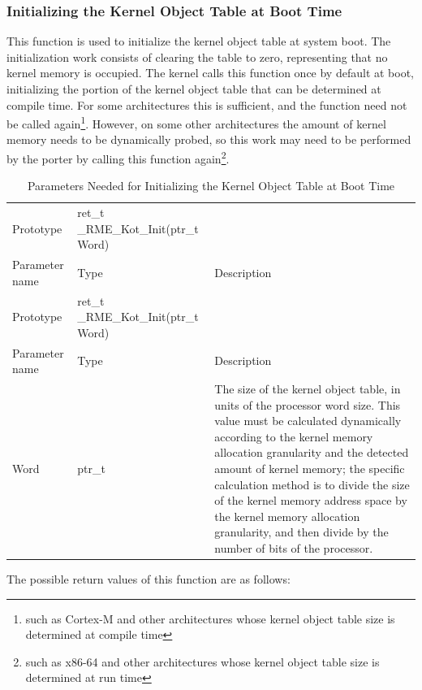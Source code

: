 \subsubsection{Initializing the Kernel Object Table at Boot Time}\label{subsubsec:7-init-kernel-object-table-at-boot}

This function is used to initialize the kernel object table at system boot. The initialization work consists of clearing the table to zero, representing that no kernel memory is occupied. The kernel calls this function once by default at boot, initializing the portion of the kernel object table that can be determined at compile time. For some architectures this is sufficient, and the function need not be called again\footnote{such as Cortex-M and other architectures whose kernel object table size is determined at compile time}. However, on some other architectures the amount of kernel memory needs to be dynamically probed, so this work may need to be performed by the porter by calling this function again\footnote{such as x86-64 and other architectures whose kernel object table size is determined at run time}.

\begin{xltabular}{\textwidth}{@{}>{\hsize\raggedright\arraybackslash}X>{\hsize\raggedright\arraybackslash}X>{\hsize\raggedright\arraybackslash}X@{}}
\caption{Parameters Needed for Initializing the Kernel Object Table at Boot Time}\label{tab:7-38-init-kernel-object-table-at-boot-parameters}\\
\toprule
Prototype & ret\_t \_RME\_Kot\_Init(ptr\_t Word) &\tabularnewline
Parameter name & Type & Description\tabularnewline
\endfirsthead
\toprule
Prototype & ret\_t \_RME\_Kot\_Init(ptr\_t Word) &\tabularnewline
Parameter name & Type & Description\tabularnewline
\midrule
\endhead
\bottomrule
\endlastfoot
Word & ptr\_t &
The size of the kernel object table, in units of the processor word size. This value must be calculated dynamically according to the kernel memory allocation granularity and the detected amount of kernel memory; the specific calculation method is to divide the size of the kernel memory address space by the kernel memory allocation granularity, and then divide by the number of bits of the processor.\tabularnewline
\end{xltabular}
\nopagebreak[4]

The possible return values of this function are as follows:

